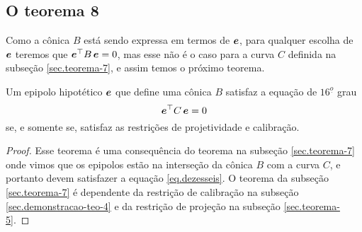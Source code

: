 \subsection{O teorema 8}
Como a cônica $B$ está sendo expressa em termos de $\boldsymbol{e}$, para qualquer escolha de $\boldsymbol{e}$ teremos que $\boldsymbol{e}^\top B\,\boldsymbol{e}=0$, mas esse não é o caso para a curva $C$ definida na subseção \ref{sec.teorema-7}, e assim temos o próximo teorema.

\begin{teorema} 
Um epipolo hipotético $\boldsymbol{e}$ que define uma cônica $B$ satisfaz a equação de $16^{\underline{o}}$ grau 
\begin{equation}\label{eq.dezesseis}
\boldsymbol{e}^\top C\,\boldsymbol{e}=0
\end{equation}
se, e somente se, satisfaz as restrições de projetividade e calibração.
\end{teorema}
\begin{proof}
Esse teorema é uma consequência do teorema na subseção \ref{sec.teorema-7} onde vimos que os epipolos estão na interseção da cônica $B$ com a curva $C$, e portanto devem satisfazer a equação \ref{eq.dezesseis}. O teorema da subseção \ref{sec.teorema-7} é dependente da restrição de calibração na subseção \ref{sec.demonstracao-teo-4} e da restrição de projeção na subseção \ref{sec.teorema-5}. 
\end{proof}

